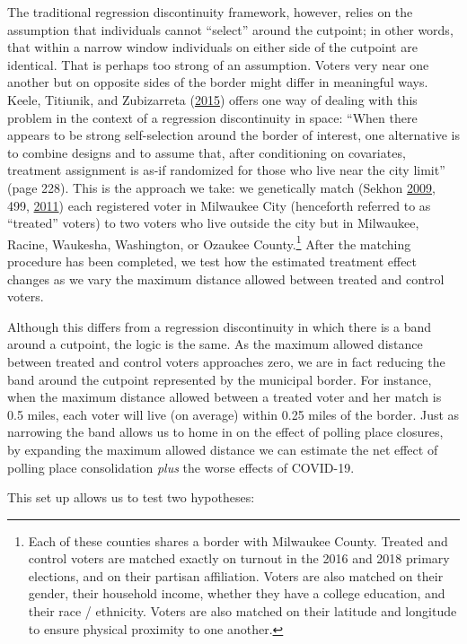 \documentclass[
  12pt,
]{article}
\begin{document}
The traditional regression discontinuity framework, however, relies on the assumption that individuals cannot ``select'' around the cutpoint; in other words, that within a narrow window individuals on either side of the cutpoint are identical. That is perhaps too strong of an assumption. Voters very near one another but on opposite sides of the border might differ in meaningful ways. Keele, Titiunik, and Zubizarreta (\protect\hyperlink{ref-Keele2015}{2015}) offers one way of dealing with this problem in the context of a regression discontinuity in space: ``When there appears to be strong self-selection around the border of interest, one alternative is to combine designs and to assume that, after conditioning on covariates, treatment assignment is as-if randomized for those who live near the city limit'' (page 228). This is the approach we take: we genetically match (Sekhon \protect\hyperlink{ref-Sekhon2009}{2009}, 499, \protect\hyperlink{ref-Sekhon2011}{2011}) each registered voter in Milwaukee City (henceforth referred to as ``treated'' voters) to two voters who live outside the city but in Milwaukee, Racine, Waukesha, Washington, or Ozaukee County.\footnote{Each of these counties shares a border with Milwaukee County. Treated and control voters are matched exactly on turnout in the 2016 and 2018 primary elections, and on their partisan affiliation. Voters are also matched on their gender, their household income, whether they have a college education, and their race / ethnicity. Voters are also matched on their latitude and longitude to ensure physical proximity to one another.} After the matching procedure has been completed, we test how the estimated treatment effect changes as we vary the maximum distance allowed between treated and control voters.

Although this differs from a regression discontinuity in which there is a band around a cutpoint, the logic is the same. As the maximum allowed distance between treated and control voters approaches zero, we are in fact reducing the band around the cutpoint represented by the municipal border. For instance, when the maximum distance allowed between a treated voter and her match is 0.5 miles, each voter will live (on average) within 0.25 miles of the border. Just as narrowing the band allows us to home in on the effect of polling place closures, by expanding the maximum allowed distance we can estimate the net effect of polling place consolidation \emph{plus} the worse effects of COVID-19.

This set up allows us to test two hypotheses:
\end{document}
